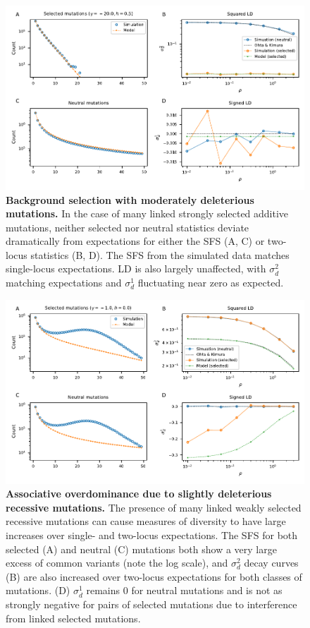 \documentclass[]{article}
\begin{document}
\begin{figure}[ht!]
    \centering
    \includegraphics{../figures/bgs_gamma_-20.0_h_0.5_n_50}
    \caption{
        \textbf{Background selection with moderately deleterious mutations.}
        In the case of many linked strongly selected additive mutations, neither
        selected nor neutral statistics deviate dramatically from expectations
        for either the SFS (A, C) or two-locus statistics (B, D).
        The SFS from the simulated data matches single-locus expectations.
        LD is also largely unaffected, with \(\sigma_d^2\)
        matching expectations and \(\sigma_d^1\) fluctuating near zero as expected.
    }
    \label{fig:bgs2}
\end{figure}

\begin{figure}[ht!]
    \centering
    \includegraphics{../figures/bgs_gamma_-1.0_h_0.0_n_50}
    \caption{
        \textbf{Associative overdominance due to slightly deleterious recessive mutations.}
        The presence of many linked weakly selected recessive mutations can cause
        measures of diversity to have large increases over single- and two-locus
        expectations. The SFS for both selected (A) and neutral (C) mutations both show
        a very large excess of common variants (note the log scale), and \(\sigma_d^2\)
        decay curves (B)
        are also increased over two-locus expectations for both classes of mutations.
        (D) \(\sigma_d^1\) remains 0 for neutral mutations and is not as strongly
        negative for pairs of selected mutations due to interference from linked selected
        mutations.
    }
    \label{fig:bgs3}
\end{figure}
\end{document}
